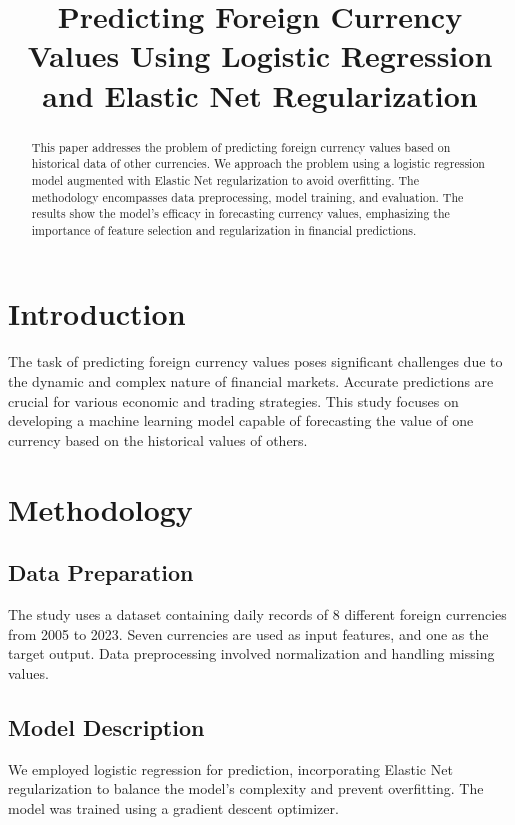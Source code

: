 \documentclass[conference]{IEEEtran}
\begin{document}
\title{Predicting Foreign Currency Values Using Logistic Regression and Elastic Net Regularization}

\author{
}

\maketitle

\begin{abstract}
This paper addresses the problem of predicting foreign currency values based on historical data of other currencies. We approach the problem using a logistic regression model augmented with Elastic Net regularization to avoid overfitting. The methodology encompasses data preprocessing, model training, and evaluation. The results show the model's efficacy in forecasting currency values, emphasizing the importance of feature selection and regularization in financial predictions.
\end{abstract}

\section{Introduction}
The task of predicting foreign currency values poses significant challenges due to the dynamic and complex nature of financial markets. Accurate predictions are crucial for various economic and trading strategies. This study focuses on developing a machine learning model capable of forecasting the value of one currency based on the historical values of others.

\section{Methodology}
\subsection{Data Preparation}
The study uses a dataset containing daily records of 8 different foreign currencies from 2005 to 2023. Seven currencies are used as input features, and one as the target output. Data preprocessing involved normalization and handling missing values.

\subsection{Model Description}
We employed logistic regression for prediction, incorporating Elastic Net regularization to balance the model's complexity and prevent overfitting. The model was trained using a gradient descent optimizer.
\end{document}
